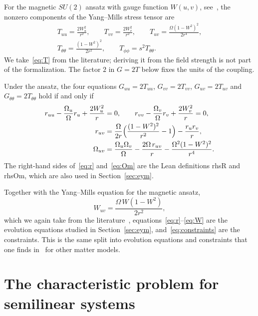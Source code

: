 \documentclass{lmcs}
\DeclareRobustCommand{\lean}[1]{{\ttfamily\def\_{\textunderscore\allowbreak}#1}}
\begin{document}
For the magnetic $SU(2)$ ansatz with gauge function $W(u,v)$, see~\cite{BartnikMcKinnon1988,VolkovGaltsov1999}, the nonzero components of the Yang--Mills stress tensor are
\begin{equation}\label{eq:T}
\begin{gathered}
T_{uu}=\frac{2W_u^2}{r^2},\qquad T_{vv}=\frac{2W_v^2}{r^2},\qquad T_{uv}=\frac{\Omega(1-W^2)^2}{2r^4},\\
T_{\theta\theta}=\frac{(1-W^2)^2}{2r^2},\qquad T_{\phi\phi}=s^2T_{\theta\theta}.
\end{gathered}
\end{equation}
We take~\eqref{eq:T} from the literature; deriving it from the field strength is not part of the formalization. The factor $2$ in $G=2T$ below fixes the units of the coupling.

\begin{thm}[\lean{einstein\_iff\_system}]\label{thm:reduction}
Under the ansatz, the four equations $G_{uu}=2T_{uu}$, $G_{vv}=2T_{vv}$, $G_{uv}=2T_{uv}$ and $G_{\theta\theta}=2T_{\theta\theta}$ hold if and only if
\begin{align}
r_{uu}-\frac{\Omega_u}{\Omega}r_u+\frac{2W_u^2}{r}&=0,\qquad r_{vv}-\frac{\Omega_v}{\Omega}r_v+\frac{2W_v^2}{r}=0,\label{eq:constraints}\\
r_{uv}&=\frac{\Omega}{2r}\Bigl(\frac{(1-W^2)^2}{r^2}-1\Bigr)-\frac{r_ur_v}{r},\label{eq:r}\\
\Omega_{uv}&=\frac{\Omega_u\Omega_v}{\Omega}-\frac{2\Omega\,r_{uv}}{r}-\frac{\Omega^2(1-W^2)^2}{r^4}.\label{eq:Om}
\end{align}
The right-hand sides of~\eqref{eq:r} and~\eqref{eq:Om} are the Lean definitions \lean{rhsR} and \lean{rhsOm}, which are also used in Section~\ref{sec:eym}.
\end{thm}

Together with the Yang--Mills equation for the magnetic ansatz,
\begin{equation}\label{eq:W}
W_{uv}=\frac{\Omega\,W(1-W^2)}{2r^2},
\end{equation}
which we again take from the literature~\cite{VolkovGaltsov1999}, equations~\eqref{eq:r}--\eqref{eq:W} are the evolution equations studied in Section~\ref{sec:eym}, and~\eqref{eq:constraints} are the constraints. This is the same split into evolution equations and constraints that one finds in~\cite{Christodoulou1986,Dafermos2005} for other matter models.

\section{The characteristic problem for semilinear systems}\label{sec:goursat}
\end{document}
